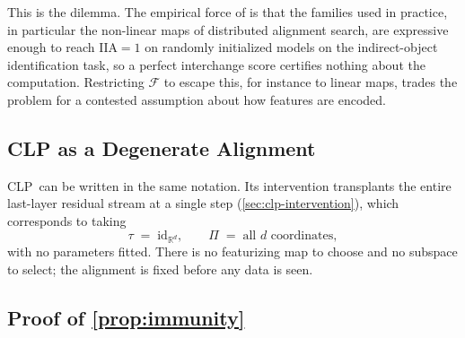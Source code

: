 \documentclass[11pt]{article}
\newcommand{\CLP}{\textsc{CLP}}
\begin{document}
\noindent This is the dilemma. The empirical force of \citet{sutter2025nonlinear}
is that the families used in practice, in particular the non-linear maps of
distributed alignment search, are expressive enough to reach
$\mathrm{IIA}=1$ on randomly initialized models on the indirect-object
identification task, so a perfect interchange score certifies nothing about the
computation. Restricting $\mathcal{F}$ to escape this, for instance to linear
maps, trades the problem for a contested assumption about how features are
encoded.

\subsection{CLP as a Degenerate Alignment}
\label{app:dilemma-clp}

\CLP\ can be written in the same notation. Its intervention transplants the
entire last-layer residual stream at a single step (\cref{sec:clp-intervention}),
which corresponds to taking
\begin{equation}
\label{eq:clp-align}
\tau \;=\; \mathrm{id}_{\mathbb{R}^{d}}, \qquad \Pi \;=\; \text{all } d
\text{ coordinates},
\end{equation}
with no parameters fitted. There is no featurizing map to choose and no subspace
to select; the alignment is fixed before any data is seen.

\subsection{Proof of \texorpdfstring{\cref{prop:immunity}}{Proposition 1}}
\label{app:dilemma-proof}
\end{document}
